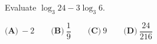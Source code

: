 Evaluate $\log_3 24-3\log_3 6$.

$\textbf{(A)}\ -2\qquad\textbf{(B)}\ \dfrac{1}{9}\qquad\textbf{(C)}\ 9\qquad\textbf{(D)}\ \dfrac{24}{216}$
